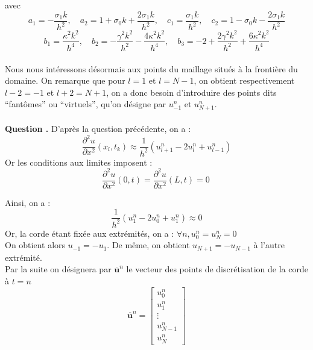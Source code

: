 \documentclass[a4,12pt]{article}
\newcommand{\ub}{\mathbf{u}}
\newcounter{Nbquestion}
\newcommand*\question{%
  \stepcounter{Nbquestion}%
  \textbf{Question \theNbquestion. }}
\begin{document}
	    avec 
	    \[ 
	      a_1=-\frac{\sigma_1 k}{h^2},\quad a_2=1+\sigma_0 k+\frac{2\sigma_1 k}{h^2}, 
	      \quad c_1=\frac{\sigma_1 k}{h^2},\quad c_2=1-\sigma_0 k-\frac{2\sigma_1 k}{h^2}
	    \]
	    \[
	      b_1=\frac{\kappa^2 k^2}{h^4}, \quad b_2=-\frac{\gamma^2 k^2}{h^2}-\frac{4\kappa^2 k^2}{h^4},
	      \quad b_3=-2+\frac{2\gamma^2 k^2}{h^2}+\frac{6\kappa^2 k^2}{h^4}
	    \]
	    ~\\

	    Nous nous intéressons désormais aux points du maillage situés à la frontière du domaine. On remarque que pour $l=1$ et $l=N-1$, on obtient respectivement $l-2=-1$ et $l+2=N+1$, on a donc besoin d'introduire des points dits \enquote{fantômes} ou \enquote{virtuels}, qu'on désigne par $u_{-1}^n$ et $u_{N+1}^n$.\\
	    ~\\

	    \question D'après la question précédente, on a :
	    \[
	      \frac{\partial^2 u}{\partial x^2}(x_l,t_k)\approx \frac{1}{h^2}(u_{l+1}^n-2u_l^n+u_{l-1}^n)
	    \]
	    Or les conditions aux limites imposent :
	    \[
	      \frac{\partial^2 u}{\partial x^2}(0,t)=\frac{\partial^2 u}{\partial x^2}(L,t)=0\
	    \]

	    Ainsi, on a :
	    \[
	      \frac{1}{h^2}(u_{1}^n-2u_0^n+u_{1}^n) \approx 0
	    \]
	    Or, la corde étant fixée aux extrémités, on a : $\forall n, u_0^n = u_N^n = 0$\\
	    On obtient alors $u_{-1}=-u_1$. De même, on obtient $u_{N+1}=-u_{N-1}$ à l'autre extrémité.\\

	    Par la suite on désignera par $\overline{\ub}^n$ le vecteur des points de discrétisation de la corde à $t=n$ 
	    \[
	      \overline{\ub}^n=\begin{bmatrix}u_0^n\\ u_1^n\\ \vdots \\ u_{N-1}^n \\ u_N^n\end{bmatrix}
	    \]
\end{document}
